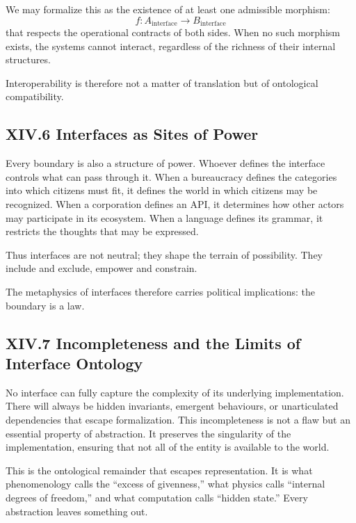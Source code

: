\documentclass[12pt,letterpaper]{article}
\begin{document}
We may formalize this as the existence of at least one admissible morphism:
\[
f: A_{\text{interface}} \to B_{\text{interface}}
\]
that respects the operational contracts of both sides. When no such morphism exists, the systems cannot interact, regardless of the richness of their internal structures.

Interoperability is therefore not a matter of translation but of ontological compatibility.

\subsection{XIV.6 Interfaces as Sites of Power}

Every boundary is also a structure of power. Whoever defines the interface controls what can pass through it. When a bureaucracy defines the categories into which citizens must fit, it defines the world in which citizens may be recognized. When a corporation defines an API, it determines how other actors may participate in its ecosystem. When a language defines its grammar, it restricts the thoughts that may be expressed.

Thus interfaces are not neutral; they shape the terrain of possibility. They include and exclude, empower and constrain.

The metaphysics of interfaces therefore carries political implications: the boundary is a law.

\subsection{XIV.7 Incompleteness and the Limits of Interface Ontology}

No interface can fully capture the complexity of its underlying implementation. There will always be hidden invariants, emergent behaviours, or unarticulated dependencies that escape formalization. This incompleteness is not a flaw but an essential property of abstraction. It preserves the singularity of the implementation, ensuring that not all of the entity is available to the world.

This is the ontological remainder that escapes representation. It is what phenomenology calls the ``excess of givenness,'' what physics calls ``internal degrees of freedom,'' and what computation calls ``hidden state.'' Every abstraction leaves something out.
\end{document}
